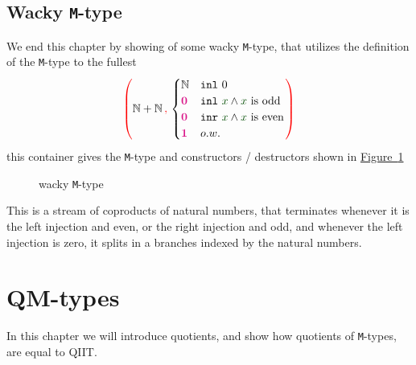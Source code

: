 \documentclass[twoside,11pt,openright]{report}
\theoremstyle{plain} %
\theoremstyle{definition}
\theoremstyle{remark}
\newcommand*{\figref}[1]{\hyperref[fig:#1]{Figure~\ref*{fig:#1}}}
\newcommand*{\term}[1]{\textcolor{green!30!black}{#1}} %
\newcommand*{\type}[1]{\textcolor{magenta!90!black}{#1}}
\newcommand*{\containerpair}[2]{\ensuremath{\colorlet{savedleftcolor}{.}\color{red}\left(\color{savedleftcolor}#1\,\textcolor{red}{\mathbf{,}}\,#2\color{red}\right)\color{savedleftcolor}}}
\newcommand*{\unit}{\type{\textbf{1}}}
\newcommand*{\empt}{\type{\textbf{0}}}
\newcommand*{\constructor}[1]{\textcolor{purple!60!black}{\ensuremath{\mathtt{#1}}}}
\newcommand*{\destructor}[1]{\textcolor{pink!60!black}{\ensuremath{\mathtt{#1}}}}
\begin{document}
\section{Wacky \texttt{M}-type}
We end this chapter by showing of some wacky \texttt{M}-type, that utilizes the definition of the \texttt{M}-type to the fullest
\begin{equation}
  \containerpair{\mathbb{N} + \mathbb{N}}{\begin{cases} \mathbb{N} & \mathtt{inl}~0 \\ \empt & \mathtt{inl}~\term{x} \land \term{x}~\text{is odd} \\ \empt & \mathtt{inr}~\term{x} \land \term{x}~\text{is even} \\ \unit & o.w. \end{cases}}
\end{equation}
this container gives the \texttt{M}-type and constructors / destructors shown in \figref{wacky-m-type}
\begin{figure}[h]
  \centering
  \caption{wacky \texttt{M}-type}
  \label{fig:wacky-m-type}
\end{figure}
This is a stream of coproducts of natural numbers, that terminates whenever it is the left injection and even, or the right injection and odd, and whenever the left injection is zero, it splits in a branches indexed by the natural numbers.




\chapter{QM-types}
In this chapter we will introduce quotients, and show how quotients of \texttt{M}-types, are equal to QIIT. 
\end{document}
